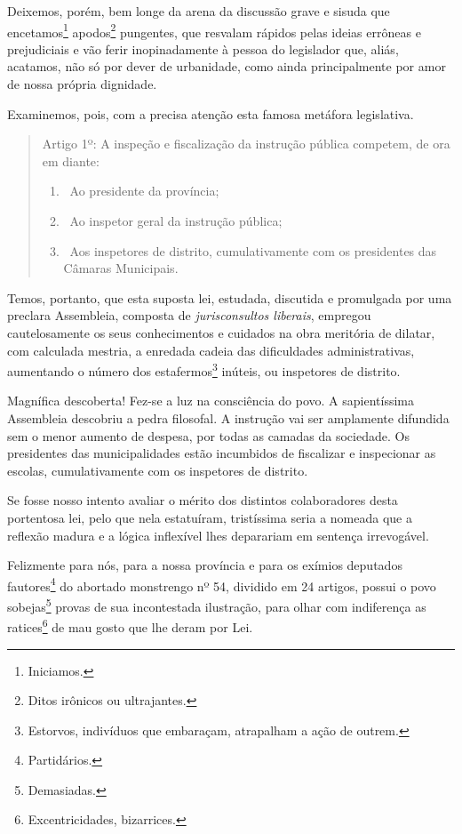 Deixemos, porém, bem longe da arena da discussão grave e sisuda que
encetamos\footnote{Iniciamos.} apodos\footnote{Ditos irônicos ou
  ultrajantes.} pungentes, que resvalam rápidos pelas ideias errôneas e
prejudiciais e vão ferir inopinadamente à pessoa do legislador que,
aliás, acatamos, não só por dever de urbanidade, como ainda
principalmente por amor de nossa própria dignidade.

Examinemos, pois, com a precisa atenção esta famosa metáfora
legislativa.

\begin{quote}
Artigo 1º: A inspeção e fiscalização da instrução pública competem, de
ora em diante:

\begin{enumerate}[label=§ \arabic*º:]
\item\ Ao presidente da província;

\item\ Ao inspetor geral da instrução pública;

\item\ Aos inspetores de distrito, cumulativamente com os presidentes das
Câmaras Municipais.
\end{enumerate}
\end{quote}

Temos, portanto, que esta suposta lei, estudada, discutida e promulgada
por uma preclara Assembleia, composta de \emph{jurisconsultos liberais},
empregou cautelosamente os seus conhecimentos e cuidados na obra
meritória de dilatar, com calculada mestria, a enredada cadeia das
dificuldades administrativas, aumentando o número dos
estafermos\footnote{Estorvos, indivíduos que embaraçam, atrapalham a
  ação de outrem.} inúteis, ou inspetores de distrito.

Magnífica descoberta! Fez-se a luz na consciência do povo. A
sapientíssima Assembleia descobriu a pedra filosofal. A instrução vai
ser amplamente difundida sem o menor aumento de despesa, por todas as
camadas da sociedade. Os presidentes das municipalidades estão
incumbidos de fiscalizar e inspecionar as escolas, cumulativamente com
os inspetores de distrito.

Se fosse nosso intento avaliar o mérito dos distintos colaboradores
desta portentosa lei, pelo que nela estatuíram, tristíssima seria a
nomeada que a reflexão madura e a lógica inflexível lhes deparariam em
sentença irrevogável.

Felizmente para nós, para a nossa província e para os exímios deputados
fautores\footnote{Partidários.} do abortado monstrengo nº 54, dividido
em 24 artigos, possui o povo sobejas\footnote{Demasiadas.} provas de
sua incontestada ilustração, para olhar com indiferença as
ratices\footnote{Excentricidades, bizarrices.} de mau gosto que lhe
deram por Lei.

